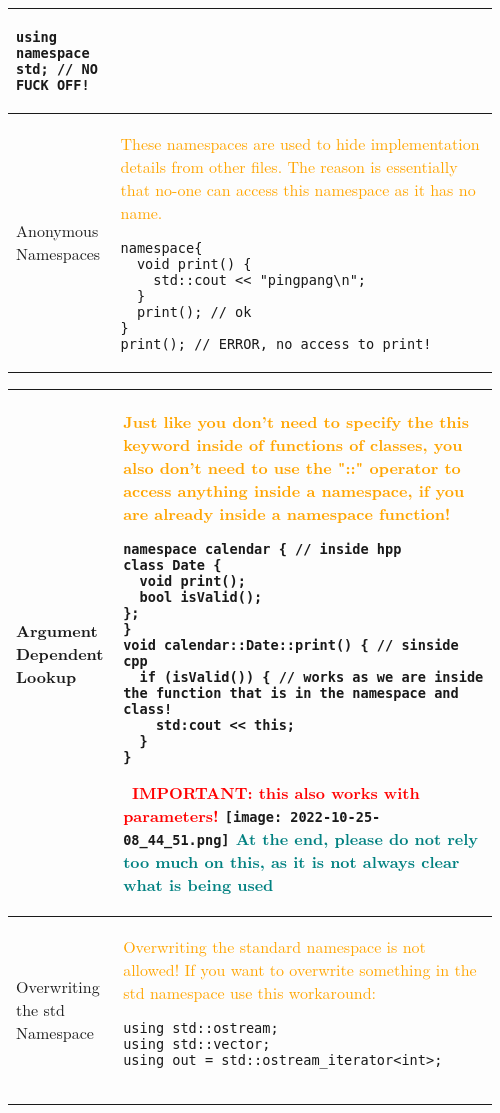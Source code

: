 \documentclass[main.tex,fontsize=8pt,paper=a4,paper=portrait,DIV=calc,]{scrartcl}
\begin{document}
\begin{table}[ht!]
\begin{tabular}{|m{0.2\linewidth}|m{0.755\linewidth}|}
\begin{lstlisting}
using namespace std; // NO FUCK OFF!
\end{lstlisting}\\
\hline
Anonymous Namespaces & 
\textcolor{orange}{These namespaces are used to hide implementation details from other files.\newline
The reason is essentially that no-one can access this namespace as it has no name.}\newline
\begin{lstlisting}
namespace{
  void print() {
    std::cout << "pingpang\n";
  }
  print(); // ok
}
print(); // ERROR, no access to print!
\end{lstlisting}\\
\hline
\end{tabular}
\end{table}
\pagebreak
\begin{table}[ht!]
\begin{tabular}{|m{0.2\linewidth}|m{0.755\linewidth}|}
\hline
Argument Dependent Lookup & 
\textcolor{orange}{Just like you don't need to specify the this keyword inside of functions of classes,\newline
you also don't need to use the "::" operator to access anything inside a namespace, if you are already inside a namespace function!}\newline
\begin{lstlisting}
namespace calendar { // inside hpp
class Date {
  void print();
  bool isValid();
};
}
void calendar::Date::print() { // sinside cpp
  if (isValid()) { // works as we are inside the function that is in the namespace and class!
    std:cout << this;
  }
}
\end{lstlisting}
\, \newline
\textcolor{red}{IMPORTANT: this also works with parameters!}\newline
\texttt{[image: 2022-10-25-08\_44\_51.png]}\newline
\textcolor{teal}{At the end, please do not rely too much on this, as it is not always clear what is being used}\\
\hline
Overwriting the std Namespace & 
\textcolor{orange}{Overwriting the standard namespace is not allowed!\newline
If you want to overwrite something in the std namespace use this workaround:}\newline
\begin{lstlisting}
using std::ostream;
using std::vector;
using out = std::ostream_iterator<int>;


\end{lstlisting}
\end{tabular}
\end{table}
\end{document}
